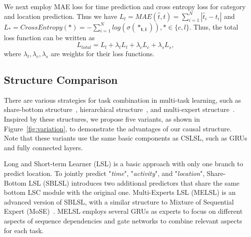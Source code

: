 \documentclass[sigconf]{acmart}
\begin{document}
    We next employ MAE loss for time prediction and cross entropy loss for category and location prediction. Thus we have 
    $L_t=MAE(\hat{t},t)=\sum^{N}_{i=1}|\hat{t}_i-t_i|$ and 
    $L_*=CrossEntropy(*)=-\sum^{N}_{i=1} log(\sigma(\boldsymbol{*_{t,i}})),*\in\{c,l\}$. Thus, the total loss function can be written as
    \begin{equation}
        L_{total} = L_l + \lambda_t L_t + \lambda_c L_c + \lambda_s L_s,
    \end{equation}
    where $\lambda_t, \lambda_c, \lambda_s$ are weights for their loss functions. 

\subsection{Structure Comparison}
\label{sec:variant}

    There are various strategies for task combination in multi-task learning, such as share-bottom structure~\cite{ruder2017overview,qin2020multitask}, hierarchical structure~\cite{sanh2019hierarchical,chen2020context}, and multi-expert structure~\cite{ma2018modeling,qin2020multitask}. Inspired by these structures, we propose five variants, as shown in Figure~\ref{fig:variation}, to demonstrate the advantages of our causal structure. Note that these variants use the same basic components as CSLSL, such as GRUs and fully connected layers.
    
    Long and Short-term Learner (LSL) is a basic approach with only one branch to predict location. To jointly predict "\textit{time}", "\textit{activity}", and "\textit{location}", Share-Bottom LSL (SBLSL)
    introduces two additional predictors that share the same bottom LSC module with the original one. Multi-Experts LSL (MELSL) is an advanced version of SBLSL, with a similar structure to Mixture of Sequential Expert (MoSE)~\cite{qin2020multitask}. MELSL employs several GRUs as experts to focus on different aspects of sequence dependencies and gate networks to combine relevant aspects for each task.
    
\end{document}
